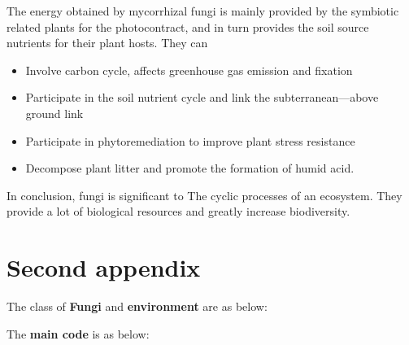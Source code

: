 \documentclass{mcmthesis}
\begin{document}
\begin{appendices}
The energy obtained by mycorrhizal fungi is mainly provided by the symbiotic related plants for the photocontract, and in turn provides the soil source nutrients for their plant hosts. 
They can
\begin{itemize}
  \item Involve carbon cycle, affects greenhouse gas emission and fixation
  \item Participate in the soil nutrient cycle and link the subterranean---above ground link
  \item Participate in phytoremediation to improve plant stress resistance
  \item Decompose plant litter and promote the formation of humid acid.
\end{itemize} 

In conclusion, fungi is significant to The cyclic processes of an ecosystem. 
They provide a lot of biological resources and greatly increase biodiversity.



\newpage
\section{Second appendix}

% 
The class of \textcolor[rgb]{0.98,0,0}{\textbf{Fungi}} and \textcolor[rgb]{0.98,0,0}{\textbf{environment}} are as below:


The \textcolor[rgb]{0.98,0,0}{\textbf{main code}} is as below:


\end{appendices}
\end{document}
